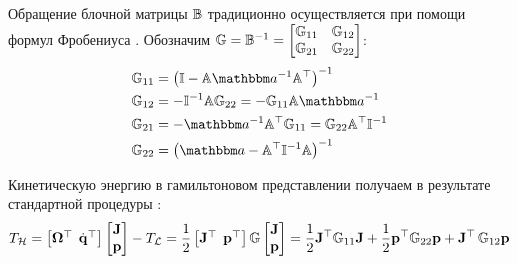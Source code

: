 Обращение блочной матрицы $\mathbb{B}$ традиционно осуществляется \cite{petrov2015} при помощи формул Фробениуса \cite{gantmaher}. Обозначим $\mathbb{G} = \mathbb{B}^{-1} = \begin{bmatrix} \mathbb{G}_{11} & \mathbb{G}_{12} \\ \mathbb{G}_{21} & \mathbb{G}_{22} \end{bmatrix}$:
\vverh
\begin{gather}
	\begin{aligned}
		\bbG_{11} &= \lb \bbI - \bbA \bba^{-1} \bbA^\top \rb^{-1} \\
		\bbG_{12} &= - \bbI^{-1} \bbA \bbG_{22} = - \bbG_{11} \bbA \bba^{-1} \\
		\bbG_{21} &= - \bba^{-1} \bbA^\top \bbG_{11} = \bbG_{22} \bbA^\top \bbI^{-1} \\
		\bbG_{22} &= \lb \bba - \bbA^\top \bbI^{-1} \bbA \rb^{-1}
	\end{aligned} \label{frob} 
\end{gather}

Кинетическую энергию в гамильтоновом представлении получаем в результате стандартной процедуры \cite{petrov2015}:
\vverh
\begin{gather}
	T_\mH = 
	\begin{bmatrix}
		\mf{\Omega}^\top & \hspace*{-2mm} \dot{\mf{q}}^\top
	\end{bmatrix}
	\begin{bmatrix}
		\mf{J} \\
		\mf{p}
	\end{bmatrix}
	- T_\mL = \frac{1}{2} 
	\begin{bmatrix}
		\mf{J}^\top & \hspace*{-2mm} \mf{p}^\top
	\end{bmatrix}
	\bbG
	\begin{bmatrix}
		\mf{J} \\
		\mf{p}
	\end{bmatrix} = 
	\frac{1}{2} \mf{J}^\top \bbG_{11} \mf{J} + \frac{1}{2} \mf{p}^\top \bbG_{22} \mf{p} + \mf{J}^\top \, \bbG_{12} \mf{p} \label{genham} 
\end{gather}


